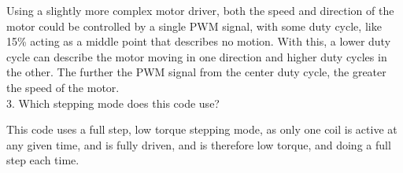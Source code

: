 \documentclass[CMPE]{KGCOEReport}
\begin{document}
\indent Using a slightly more complex motor driver, both the speed and direction
of the motor could be controlled by a single PWM signal, with some duty cycle,
like 15\% acting as a middle point that describes no motion. With this, a lower
duty cycle can describe the motor moving in one direction and higher duty cycles
in the other. The further the PWM signal from the center duty cycle, the greater
the speed of the motor. \\

3. Which stepping mode does this code use?

\indent This code uses a full step, low torque stepping mode, as only one
coil is active at any given time, and is fully driven, and is therefore low 
torque, and doing a full step each time.
\end{document}
